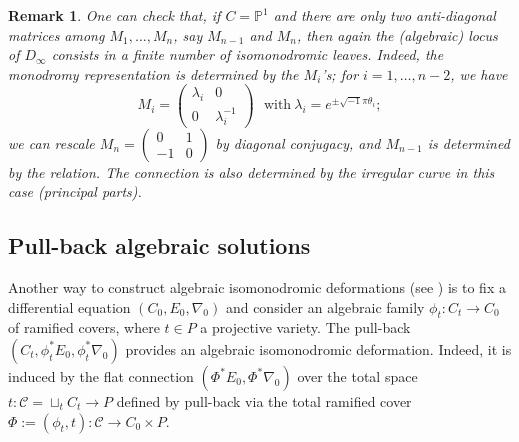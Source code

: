 \documentclass[12]{amsart}
\newtheorem{remark}[thm]{Remark}
\begin{document}
\begin{remark}\label{rem:2antidiagDinfty}
One can check that, if $C=\mathbb P^1$ and there are only two anti-diagonal matrices among $M_1,\ldots,M_n$,
say $M_{n-1}$ and $M_n$, then again the (algebraic) locus of $D_\infty$ consists in a finite number of isomonodromic leaves.
Indeed, the monodromy representation is determined by the $M_i$'s; for $i=1,\ldots,n-2$, we have
$$M_i=\begin{pmatrix}\lambda_i&0\\ 0&\lambda_i^{-1}\end{pmatrix}\ \ \ \text{with}\ \lambda_i=e^{\pm \sqrt{-1}\pi\theta_i};$$ 
we can rescale $M_n=\begin{pmatrix}0&1\\-1&0\end{pmatrix}$ by diagonal conjugacy, and $M_{n-1}$ is determined by the relation.
The connection is also determined by the irregular curve in this case (principal parts).
\end{remark}

\subsection{Pull-back algebraic solutions}\label{sec:pullback}
Another way to construct algebraic isomonodromic deformations (see \cite{Doran,AK,Kitaev,AK2,Kitaev2,Kitaev3,Kitaev4,VK,VK2,Diarra1,OO}) is to fix a differential equation
$(C_0,E_0,\nabla_0)$ and consider an algebraic family $\phi_t:C_t\to C_0$ of ramified covers, 
where $t\in P$ a projective variety. The pull-back
$(C_t,\phi_t^*E_0,\phi_t^*\nabla_0)$ provides an algebraic isomonodromic deformation. Indeed, it is induced by 
the flat connection $(\Phi^*E_0,\Phi^*\nabla_0)$ over the total space $t:\mathcal C=\sqcup_t C_t\to P$ defined by pull-back
via the total ramified cover $\Phi:=(\phi_t,t):\mathcal C\to C_0\times P$. 
\end{document}
